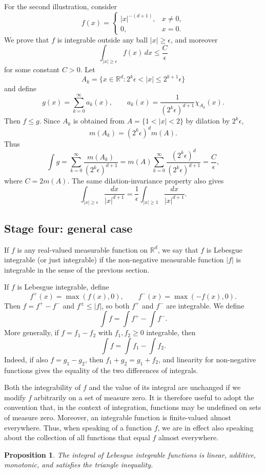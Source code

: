 \documentclass[11pt,openany]{book}
\newtheorem{proposition}[theorem]{Proposition}
\begin{document}
For the second illustration, consider
\[
f(x)=
\begin{cases}
|x|^{-(d+1)},&x\neq0,\\
0,&x=0.
\end{cases}
\]
We prove that $f$ is integrable outside any ball $|x|\geq\epsilon$, and moreover
\[
\int_{|x|\geq\epsilon}f(x)\,dx\leq\frac{C}{\epsilon}
\]
for some constant $C>0$. Let
\[
A_k=\{x\in\mathbb{R}^d:2^k\epsilon<|x|\leq2^{k+1}\epsilon\}
\]
and define
\[
g(x)=\sum_{k=0}^{\infty}a_k(x),
\qquad
a_k(x)=\frac{1}{(2^k\epsilon)^{d+1}}\chi_{A_k}(x).
\]
Then $f\leq g$. Since $A_k$ is obtained from $A=\{1<|x|<2\}$ by dilation by $2^k\epsilon$,
\[
m(A_k)=(2^k\epsilon)^d m(A).
\]
Thus
\[
\int g
=\sum_{k=0}^{\infty}\frac{m(A_k)}{(2^k\epsilon)^{d+1}}
=m(A)\sum_{k=0}^{\infty}\frac{(2^k\epsilon)^d}{(2^k\epsilon)^{d+1}}
=\frac{C}{\epsilon},
\]
where $C=2m(A)$. The same dilation-invariance property also gives
\[
\int_{|x|\geq\epsilon}\frac{dx}{|x|^{d+1}}
=\frac{1}{\epsilon}\int_{|x|\geq1}\frac{dx}{|x|^{d+1}}.
\]

\subsection*{Stage four: general case}

If $f$ is any real-valued measurable function on $\mathbb{R}^d$, we say that $f$ is Lebesgue integrable (or just integrable) if the non-negative measurable function $|f|$ is integrable in the sense of the previous section.

If $f$ is Lebesgue integrable, define
\[
f^+(x)=\max(f(x),0),
\qquad
f^-(x)=\max(-f(x),0).
\]
Then $f=f^+-f^-$ and $f^\pm\leq|f|$, so both $f^+$ and $f^-$ are integrable. We define
\[
\int f=\int f^+-\int f^-.
\]
More generally, if $f=f_1-f_2$ with $f_1,f_2\geq0$ integrable, then
\[
\int f=\int f_1-\int f_2.
\]
Indeed, if also $f=g_1-g_2$, then $f_1+g_2=g_1+f_2$, and linearity for non-negative functions gives the equality of the two differences of integrals.

Both the integrability of $f$ and the value of its integral are unchanged if we modify $f$ arbitrarily on a set of measure zero. It is therefore useful to adopt the convention that, in the context of integration, functions may be undefined on sets of measure zero. Moreover, an integrable function is finite-valued almost everywhere. Thus, when speaking of a function $f$, we are in effect also speaking about the collection of all functions that equal $f$ almost everywhere.

\begin{proposition}
The integral of Lebesgue integrable functions is linear, additive, monotonic, and satisfies the triangle inequality.
\end{proposition}
\end{document}
